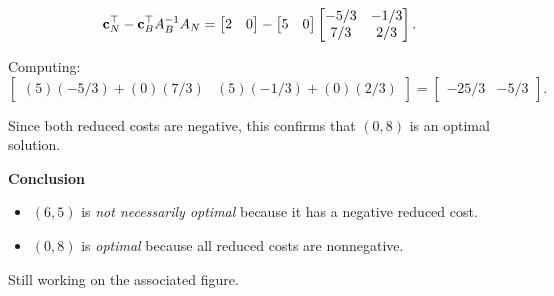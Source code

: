 \begin{solution}
\begin{itemize}
\[
\mathbf{c}_N^\top -\mathbf{c}_B^\top A_B^{-1} A_N =
\begin{bmatrix}
    2 & 0
\end{bmatrix}
-
\begin{bmatrix}
    5 & 0
\end{bmatrix}
\begin{bmatrix}
    -5/3 & -1/3 \\
    7/3 & 2/3
\end{bmatrix}.
\]

Computing:
\[
\begin{bmatrix}
    (5)(-5/3) + (0)(7/3) & (5)(-1/3) + (0)(2/3)
\end{bmatrix}
=
\begin{bmatrix}
    -25/3 & -5/3
\end{bmatrix}.
\]
\end{itemize}
Since both reduced costs are negative, this confirms that $(0,8)$ is an optimal solution.

\textbf{Conclusion}
\begin{itemize}
\item \( (6,5) \) is \emph{not necessarily optimal} because it has a negative reduced cost.
\item \( (0,8) \) is \emph{optimal} because all reduced costs are nonnegative.
\end{itemize}
\end{solution}

\begin{warn}
Still working on the associated figure.
\end{warn}




